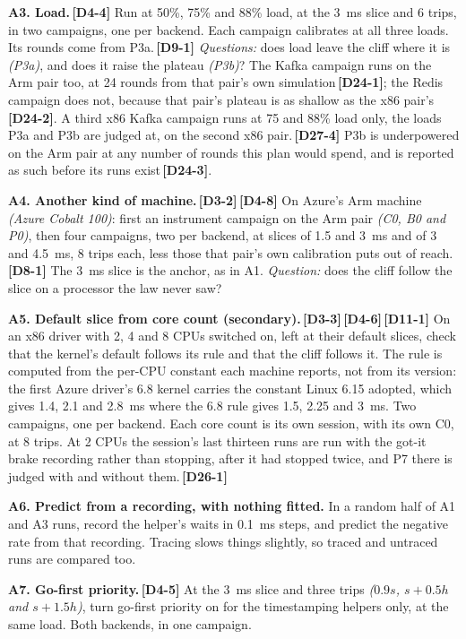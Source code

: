 \documentclass[11pt]{article}
\newcommand{\gl}[1]{{\color{soft}\itshape\small (#1)}}
\newcommand{\chgold}[1]{\,{\color{oldcol}\bfseries\footnotesize[#1]}}
\begin{document}
\textbf{A3. Load.}\chgold{D4-4} Run at 50\%, 75\% and 88\% load, at the 3~ms slice and 6 trips, in two campaigns, one per backend. Each campaign calibrates at all three loads. Its rounds come from P3a.\chgold{D9-1} \emph{Questions:} does load leave the cliff where it is \gl{P3a}, and does it raise the plateau \gl{P3b}? The Kafka campaign runs on the Arm pair too, at 24 rounds from that pair's own simulation\chgold{D24-1}; the Redis campaign does not, because that pair's plateau is as shallow as the x86 pair's\chgold{D24-2}. A third x86 Kafka campaign runs at 75 and 88\% load only, the loads P3a and P3b are judged at, on the second x86 pair.\chgold{D27-4} P3b is underpowered on the Arm pair at any number of rounds this plan would spend, and is reported as such before its runs exist\chgold{D24-3}.

\textbf{A4. Another kind of machine.}\chgold{D3-2}\chgold{D4-8} On Azure's Arm machine \gl{Azure Cobalt 100}: first an instrument campaign on the Arm pair \gl{C0, B0 and P0}, then four campaigns, two per backend, at slices of 1.5 and 3~ms and of 3 and 4.5~ms, 8 trips each, less those that pair's own calibration puts out of reach.\chgold{D8-1} The 3~ms slice is the anchor, as in A1. \emph{Question:} does the cliff follow the slice on a processor the law never saw?

\textbf{A5. Default slice from core count (secondary).}\chgold{D3-3}\chgold{D4-6}\chgold{D11-1} On an x86 driver with 2, 4 and 8 CPUs switched on, left at their default slices, check that the kernel's default follows its rule and that the cliff follows it. The rule is computed from the per-CPU constant each machine reports, not from its version: the first Azure driver's 6.8 kernel carries the constant Linux 6.15 adopted, which gives 1.4, 2.1 and 2.8~ms where the 6.8 rule gives 1.5, 2.25 and 3~ms. Two campaigns, one per backend. Each core count is its own session, with its own C0, at 8 trips. At 2 CPUs the session's last thirteen runs are run with the got-it brake recording rather than stopping, after it had stopped twice, and P7 there is judged with and without them.\chgold{D26-1}

\textbf{A6. Predict from a recording, with nothing fitted.} In a random half of A1 and A3 runs, record the helper's waits in 0.1~ms steps, and predict the negative rate from that recording. Tracing slows things slightly, so traced and untraced runs are compared too.

\textbf{A7. Go-first priority.}\chgold{D4-5} At the 3~ms slice and three trips \gl{$0.9s$, $s + 0.5h$ and $s + 1.5h$}, turn go-first priority on for the timestamping helpers only, at the same load. Both backends, in one campaign.
\end{document}
